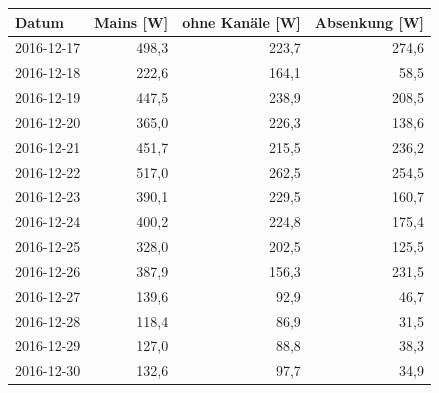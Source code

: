 \begin{tabular}{lrrr}
\toprule
Datum & Mains [W] & ohne Kanäle [W] & Absenkung [W] \\
\midrule
2016-12-17 & 498,3 & 223,7 & 274,6 \\
2016-12-18 & 222,6 & 164,1 & 58,5 \\
2016-12-19 & 447,5 & 238,9 & 208,5 \\
2016-12-20 & 365,0 & 226,3 & 138,6 \\
2016-12-21 & 451,7 & 215,5 & 236,2 \\
2016-12-22 & 517,0 & 262,5 & 254,5 \\
2016-12-23 & 390,1 & 229,5 & 160,7 \\
2016-12-24 & 400,2 & 224,8 & 175,4 \\
2016-12-25 & 328,0 & 202,5 & 125,5 \\
2016-12-26 & 387,9 & 156,3 & 231,5 \\
2016-12-27 & 139,6 & 92,9 & 46,7 \\
2016-12-28 & 118,4 & 86,9 & 31,5 \\
2016-12-29 & 127,0 & 88,8 & 38,3 \\
2016-12-30 & 132,6 & 97,7 & 34,9 \\
\bottomrule
\end{tabular}
